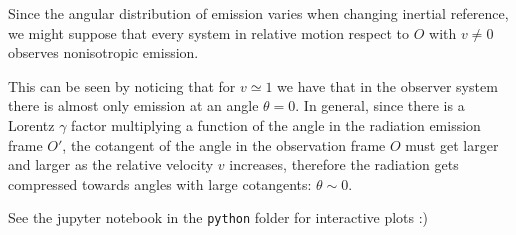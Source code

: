 \documentclass[main.tex]{subfiles}
\begin{document}
Since the angular distribution of emission varies when changing inertial reference, we might suppose that every system in relative motion respect to $O$ with $v\neq 0$ observes nonisotropic emission.

This can be seen by noticing that for $v\simeq 1$ we have that in the observer system there is almost only emission at an angle $\theta = 0$.
In general, since there is a Lorentz \(\gamma\) factor multiplying a function of the angle in the radiation emission frame \(O'\), the cotangent of the angle in the observation frame \(O\) must get larger and larger as the relative velocity \(v\) increases, therefore the radiation gets compressed towards angles with large cotangents: \(\theta\sim 0\).

See the jupyter notebook in the \texttt{python} folder for interactive plots :)
\end{document}
